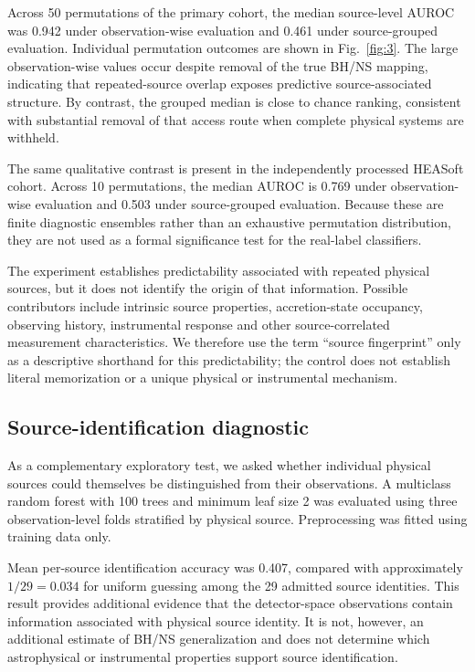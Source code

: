 \documentclass[final,5p,authoryear,nopreprintline]{elsarticle}
\begin{document}
Across 50 permutations of the primary cohort, the median source-level AUROC was 0.942 under observation-wise evaluation and 0.461 under source-grouped evaluation. Individual permutation outcomes are shown in Fig.~\ref{fig:3}. The large observation-wise values occur despite removal of the true BH/NS mapping, indicating that repeated-source overlap exposes predictive source-associated structure. By contrast, the grouped median is close to chance ranking, consistent with substantial removal of that access route when complete physical systems are withheld.

The same qualitative contrast is present in the independently processed HEASoft cohort. Across 10 permutations, the median AUROC is 0.769 under observation-wise evaluation and 0.503 under source-grouped evaluation. Because these are finite diagnostic ensembles rather than an exhaustive permutation distribution, they are not used as a formal significance test for the real-label classifiers.

The experiment establishes predictability associated with repeated physical sources, but it does not identify the origin of that information. Possible contributors include intrinsic source properties, accretion-state occupancy, observing history, instrumental response and other source-correlated measurement characteristics. We therefore use the term ``source fingerprint'' only as a descriptive shorthand for this predictability; the control does not establish literal memorization or a unique physical or instrumental mechanism.

\subsection{Source-identification diagnostic}

As a complementary exploratory test, we asked whether individual physical sources could themselves be distinguished from their observations. A multiclass random forest with 100 trees and minimum leaf size 2 was evaluated using three observation-level folds stratified by physical source. Preprocessing was fitted using training data only.

Mean per-source identification accuracy was 0.407, compared with approximately $1/29 = 0.034$ for uniform guessing among the 29 admitted source identities. This result provides additional evidence that the detector-space observations contain information associated with physical source identity. It is not, however, an additional estimate of BH/NS generalization and does not determine which astrophysical or instrumental properties support source identification.
\end{document}
